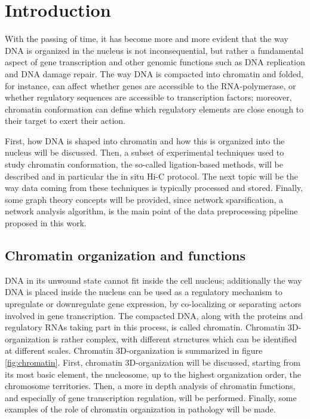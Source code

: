 \graphicspath{{chapters/02_introduction/images}}
\chapter{Introduction}

With the passing of time, it has become more and more evident that the way DNA is organized in the nucleus is not inconsequential, but rather a fundamental aspect of gene transcription and other genomic functions such as DNA replication and DNA damage repair. The way DNA is compacted into chromatin and folded, for instance, can affect whether genes are accessible to the RNA-polymerase, or whether regulatory sequences are accessible to transcription factors; moreover, chromatin conformation can define which regulatory elements are close enough to their target to exert their action\cite{chromatinfiber2015,chromatinorganization2019}.

First, how DNA is shaped into chromatin and how this is organized into the nucleus will be discussed. Then, a subset of experimental techniques used to study chromatin conformation, the so-called ligation-based methods, will be described and in particular the in situ Hi-C protocol. The next topic will be the way data coming from these techniques is typically processed and stored. Finally, some graph theory concepts will be provided, since network sparsification, a network analysis algorithm, is the main point of the data preprocessing pipeline proposed in this work.

\section{Chromatin organization and functions}

DNA in its unwound state cannot fit inside the cell nucleus; additionally the way DNA is placed inside the nucleus can be used as a regulatory mechanism to upregulate or downregulate gene expression, by co-localizing or separating actors involved in gene transcription. The compacted DNA, along with the proteins and regulatory RNAs taking part in this process, is called chromatin. Chromatin 3D-organization is rather complex, with different structures which can be identified at different scales\cite{chromatinorganization2019, chromatindevelopment2019}. Chromatin 3D-organization is summarized in figure \ref{fig:chromatin}. First, chromatin 3D-organization will be discussed, starting from its most basic element, the nucleosome, up to the highest organization order, the chromosome territories. Then, a more in depth analysis of chromatin functions, and especially of gene transcription regulation, will be performed. Finally, some examples of the role of chromatin organization in pathology will be made.

